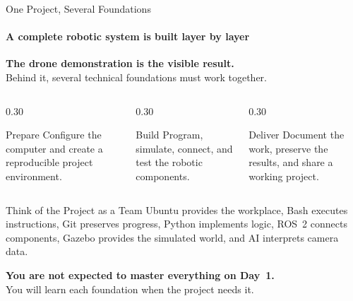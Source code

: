 % 





\begin{frame}{One Project, Several Foundations}
\framesubtitle{A complete robotic system is built layer by layer}

\footnotesize

\begin{center}
    \large
    \textbf{The drone demonstration is the visible result.}\\[0.3em]
    \normalsize
    Behind it, several technical foundations must work together.
\end{center}

\pause

\begin{columns}[T,onlytextwidth]
    \begin{column}{0.30\textwidth}
        \begin{block}{Prepare}
            Configure the computer and create a reproducible project environment.
        \end{block}
    \end{column}
    \hfill
    \begin{column}{0.30\textwidth}
        \begin{block}{Build}
            Program, simulate, connect, and test the robotic components.
        \end{block}
    \end{column}
    \hfill
    \begin{column}{0.30\textwidth}
        \begin{block}{Deliver}
            Document the work, preserve the results, and share a working project.
        \end{block}
    \end{column}
\end{columns}

\pause

\begin{exampleblock}{Think of the Project as a Team}
    Ubuntu provides the workplace, Bash executes instructions, Git preserves progress,
    Python implements logic, ROS~2 connects components, Gazebo provides the simulated
    world, and AI interprets camera data.
\end{exampleblock}

\begin{center}
    \textbf{You are not expected to master everything on Day~1.}\\
    You will learn each foundation when the project needs it.
\end{center}
\end{frame}


